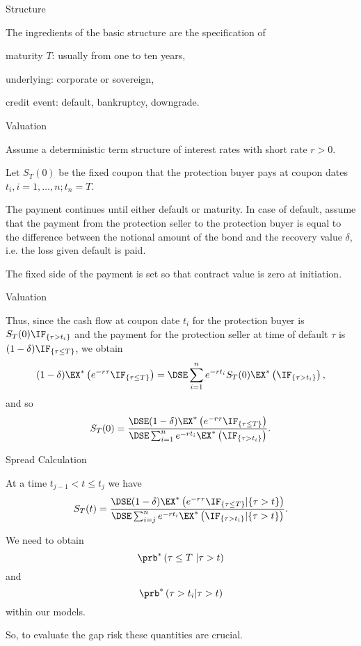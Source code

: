 {Structure}

The ingredients of the basic structure are the specification of
\item<1-> maturity $T$: usually from one to ten years,
\item<2->
underlying: corporate or sovereign, \item<3-> credit event:
default, bankruptcy, downgrade.

{Valuation}

\item<1-> Assume a deterministic term structure of interest rates with short rate $r>0$.
\item<2->Let $S_T(0)$ be the fixed coupon that the protection buyer pays at coupon dates
$t_i, i=1,\ldots, n; t_n=T$.
\item<3->The
payment continues until either default or maturity. In case of
default, assume that the payment from the protection seller to the
protection buyer is equal to the difference between the notional
amount of the bond and the recovery value $\delta$, i.e. the loss given default is paid.
\item<4->The fixed side
of the payment is set so that contract value is zero at
initiation.

{Valuation}

Thus, since the cash flow at coupon date $t_i$ for the protection
buyer is $S_T(0)\IF_{\{\tau>t_i\}}$ and the payment for the protection
seller at time of default $\tau$ is $(1-\delta)\IF_{\{\tau\leq
T\}}$, we obtain
$$
(1-\delta)\EX^*\left(e^{-r\tau}\IF_{\{\tau\leq
T\}}\right) = \DSE\sum_{i=1}^n e^{-rt_i} S_T(0)\EX^*\left(\IF_{\{\tau
>t_i\}}\right),
$$
and so
$$
S_T(0)=\frac{\DSE (1-\delta)\EX^*\left(e^{-r\tau}\IF_{\{\tau\leq
T\}}\right)} {\DSE\sum_{i=1}^n e^{-rt_i} \EX^*\left(\IF_{\{\tau
>t_i\}}\right)}.
$$

{Spread Calculation}

\item<1-> At a time $t_{j-1} < t \leq t_j$ we have
$$
S_T(t)=\frac{\DSE (1-\delta)\EX^*\left(e^{-r\tau}\IF_{\{\tau\leq
T\} }  | \{\tau >t\}\right)} {\DSE\sum_{i=j}^n e^{-rt_i} \EX^*\left(\IF_{\{\tau
>t_i\}}| \{\tau >t\}\right)}.
$$

\item<1-> We need to obtain
$$\prb^*\left(\tau\leq T\ | \tau >t \right)$$ and
$$\prb^*\left(\tau >t_i | \tau >t\right)$$ within our models.
\item<2-> So, to evaluate the gap risk these quantities are crucial.  %

